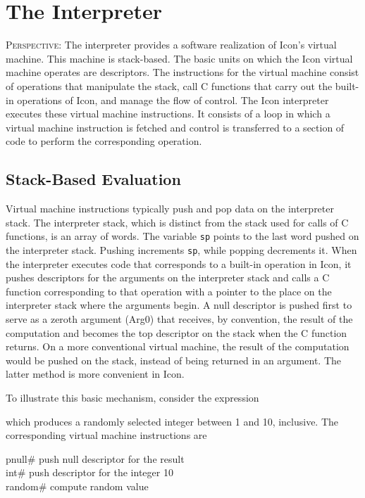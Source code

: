 \chapter{The Interpreter}

\textsc{Perspective}: The interpreter provides a software realization
of Icon's virtual machine. This machine is stack-based. The basic
units on which the Icon virtual machine operates are descriptors. The
instructions for the virtual machine consist of operations that
manipulate the stack, call C functions that carry out the built-in
operations of Icon, and manage the flow of control. The Icon
interpreter executes these virtual machine instructions.  It consists
of a loop in which a virtual machine instruction is fetched and
control is transferred to a section of code to perform the
corresponding operation.

\section{Stack-Based Evaluation}

Virtual machine instructions typically push and pop data on the
interpreter stack. The interpreter stack, which is distinct from the
stack used for calls of C functions, is an array of words. The
variable \texttt{sp} points to the last word pushed on the interpreter
stack. Pushing increments \texttt{sp}, while popping decrements it. When the
interpreter executes code that corresponds to a built-in operation in
Icon, it pushes descriptors for the arguments on the interpreter stack
and calls a C function corresponding to that operation with a pointer
to the place on the interpreter stack where the arguments begin. A
null descriptor is pushed first to serve as a
{\textquotedbl}zeroth{\textquotedbl} argument (Arg0) that receives, by
convention, the result of the computation and becomes the top
descriptor on the stack when the C function returns. On a more
conventional virtual machine, the result of the computation would be
pushed on the stack, instead of being returned in an argument. The
latter method is more convenient in Icon.

To illustrate this basic mechanism, consider the expression


\noindent which produces a randomly selected integer between 1 and 10,
inclusive. The corresponding virtual machine instructions are

\begin{iconcode}
\>pnull\>\>\>\>\>\>\# push null descriptor for the result\\
\>int\>\>\>\>\>\# push descriptor for the integer 10\\
\>random\>\>\>\>\>\>\# compute random value
\end{iconcode}

